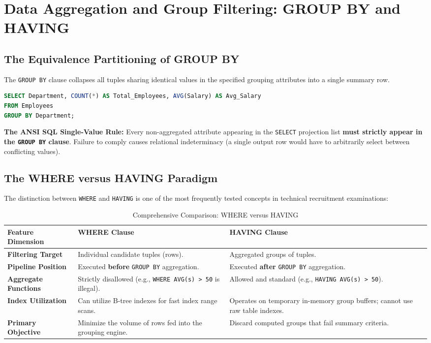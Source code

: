 \section{Data Aggregation and Group Filtering: GROUP BY and HAVING}
\label{sec:dbms_sql_group_by}

\subsection{The Equivalence Partitioning of GROUP BY}
The \texttt{GROUP BY} clause collapses all tuples sharing identical values in the specified grouping attributes into a single summary row.
\begin{lstlisting}[language=SQL]
SELECT Department, COUNT(*) AS Total_Employees, AVG(Salary) AS Avg_Salary
FROM Employees
GROUP BY Department;
\end{lstlisting}

\textbf{The ANSI SQL Single-Value Rule:} Every non-aggregated attribute appearing in the \texttt{SELECT} projection list \textbf{must strictly appear in the \texttt{GROUP BY} clause}. Failure to comply causes relational indeterminacy (a single output row would have to arbitrarily select between conflicting values).

\subsection{The WHERE versus HAVING Paradigm}
The distinction between \texttt{WHERE} and \texttt{HAVING} is one of the most frequently tested concepts in technical recruitment examinations:

\begin{table}[htbp]
\centering
\small
\caption{Comprehensive Comparison: WHERE versus HAVING}
\label{tab:where_vs_having}
\begin{tabularx}{\textwidth}{p{3.2cm} X X}
\toprule
\textbf{Feature Dimension} & \textbf{WHERE Clause} & \textbf{HAVING Clause} \\
\midrule
\textbf{Filtering Target} & Individual candidate tuples (rows). & Aggregated groups of tuples. \\
\textbf{Pipeline Position} & Executed \textbf{before} \texttt{GROUP BY} aggregation. & Executed \textbf{after} \texttt{GROUP BY} aggregation. \\
\textbf{Aggregate Functions} & Strictly disallowed (e.g., \texttt{WHERE AVG(s) > 50} is illegal). & Allowed and standard (e.g., \texttt{HAVING AVG(s) > 50}). \\
\textbf{Index Utilization} & Can utilize B-tree indexes for fast index range scans. & Operates on temporary in-memory group buffers; cannot use raw table indexes. \\
\textbf{Primary Objective} & Minimize the volume of rows fed into the grouping engine. & Discard computed groups that fail summary criteria. \\
\bottomrule
\end{tabularx}
\end{table}

